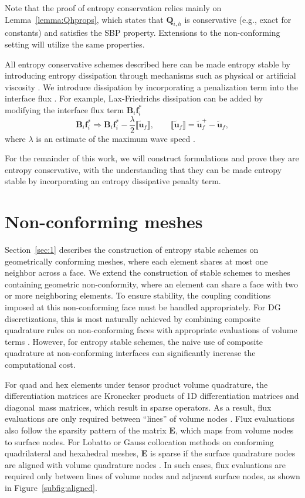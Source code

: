 \documentclass{svjour3}                     %
\renewcommand{\tilde}{\widetilde}
\newcommand{\jump}[1] {\ensuremath{\llbracket#1\rrbracket}}
\begin{document}
Note that the proof of entropy conservation relies mainly on Lemma~\ref{lemma:Qhprops}, which states that $\bm{Q}_{i,h}$ is conservative (e.g., exact for constants) and satisfies the SBP property.  Extensions to the non-conforming setting will utilize the same properties.  

All entropy conservative schemes described here can be made entropy stable by introducing entropy dissipation through mechanisms such as physical or artificial viscosity \cite{tadmor2006entropy,upperman2019entropy}.  We introduce dissipation by incorporating a penalization term into the interface flux \cite{winters2017uniquely}.  For example, Lax-Friedrichs dissipation can be added by modifying the interface flux term $\bm{B}_i\bm{f}^*_i$ 
\[
\bm{B}_i\bm{f}^*_i \Longrightarrow \bm{B}_i\bm{f}^*_i - \frac{\lambda}{2} \jump{\tilde{\bm{u}}_f}, \qquad  \jump{\tilde{\bm{u}}_f} = \tilde{\bm{u}}_f^+ - \tilde{\bm{u}}_f,
\]
where $\lambda$ is an estimate of the maximum wave speed \cite{chen2017entropy, chan2017discretely}.  

For the remainder of this work, we will construct formulations and prove they are entropy conservative, with the understanding that they can be made entropy stable by incorporating an entropy dissipative penalty term.  


\section{Non-conforming meshes}
\label{sec:2}

Section~\ref{sec:1} describes the construction of entropy stable schemes on geometrically conforming meshes, where each element shares at most one neighbor across a face.  We extend the construction of stable schemes to meshes containing geometric non-conformity, where an element can share a face with two or more neighboring elements.  To ensure stability, the coupling conditions imposed at this non-conforming face must be handled appropriately.  For DG discretizations, this is most naturally achieved by combining composite quadrature rules on non-conforming faces with appropriate evaluations of volume terms \cite{kozdon2018energy}.  However, for entropy stable schemes, the naive use of composite quadrature at non-conforming interfaces can significantly increase the computational cost.

For quad and hex elements under tensor product volume quadrature, the differentiation matrices are Kronecker products of 1D differentiation matrices and diagonal mass matrices, which result in sparse operators.  As a result, flux evaluations are only required between ``lines'' of volume nodes \cite{carpenter2014entropy, chan2018efficient}.  Flux evaluations also follow the sparsity pattern of the matrix $\bm{E}$, which maps from volume nodes to surface nodes.  For Lobatto or Gauss collocation methods on conforming quadrilateral and hexahedral meshes, $\bm{E}$ is sparse if the surface quadrature nodes are aligned with volume quadrature nodes \cite{chan2018efficient}.  In such cases, flux evaluations are required only between lines of volume nodes and adjacent surface nodes, as shown in Figure~\ref{subfig:aligned}.
\end{document}
